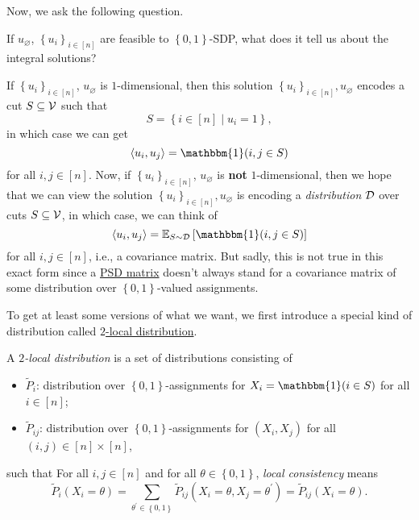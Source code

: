 Now, we ask the following question.

\begin{problem*}
	If \(u_\varnothing \), \(\left\{ u_{i}  \right\} _{i\in [n]}\) are feasible to \(\left\{ 0, 1 \right\} \)-SDP, what does it tell us about the integral solutions?
\end{problem*}
\begin{answer}
	If \(\left\{ u_i \right\} _{i\in [n]}\), \(u_\varnothing \) is \(1\)-dimensional, then this solution \(\left\{ u_i \right\} _{i\in [n]}, u_\varnothing\) encodes a cut \(S \subseteq \mathcal{\MakeUppercase{v}} \) such that
	\[
		S = \left\{ i\in [n] \mid u_i = 1 \right\},
	\]
	in which case we can get
	\[
		\left\langle u_i, u_j \right\rangle = \mathbbm{1}(i, j\in S)
	\]
	for all \(i, j\in [n]\). Now, if \(\left\{ u_i \right\} _{i\in [n]}\), \(u_\varnothing \) is \textbf{not} \(1\)-dimensional, then we hope that we can view the solution \(\left\{ u_i \right\} _{i\in [n]}, u_\varnothing \) is encoding a \emph{distribution} \(\mathcal{\MakeUppercase{d}} \) over cuts \(S \subseteq \mathcal{\MakeUppercase{v}} \), in which case, we can think of
	\[
		\left\langle u_i, u_j \right\rangle = \mathbb{E}_{S\sim \mathcal{\MakeUppercase{D}} }\left[ \mathbbm{1}(i, j\in S)\right]
	\]
	for all \(i, j\in [n]\), i.e., a covariance matrix. But sadly, this is not true in this exact form since a \hyperref[def:PSD]{PSD matrix} doesn't always stand for a covariance matrix of some distribution over \(\left\{ 0, 1 \right\} \)-valued assignments.
\end{answer}

To get at least some versions of what we want, we first introduce a special kind of distribution called \hyperref[def:2-local-distribution]{\(2\)-local distribution}.

\begin{definition}\label{def:2-local-distribution}
	A \emph{\(2\)-local distribution} is a set of distributions consisting of
	\begin{itemize}
		\item \(\widetilde{P} _i\): distribution over \(\left\{ 0, 1 \right\} \)-assignments for \(X_i= \mathbbm{1}(i\in S) \) for all \(i\in [n]\);
		\item \(\widetilde{P} _{ij}\): distribution over \(\left\{ 0, 1 \right\} \)-assignments for \((X_i, X_j)\) for all \((i, j)\in [n]\times [n]\),
	\end{itemize}
	such that For all \(i, j\in [n]\) and for all \(\theta \in \left\{ 0, 1 \right\} \), \emph{local consistency} means
	\[
		\widetilde{P} _i(X_i = \theta ) = \sum_{\theta ^\prime \in \left\{ 0, 1 \right\} } \widetilde{P} _{ij}(X_i=\theta , X_j = \theta ^\prime )= \widetilde{P} _{ij}(X_i = \theta ).
	\]
\end{definition}


